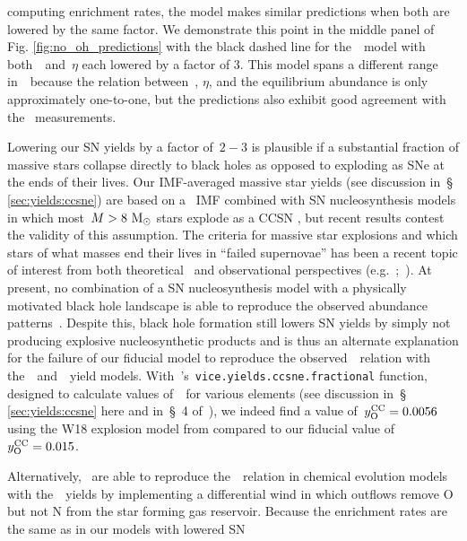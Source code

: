 \documentclass[ms.tex]{subfiles}
\begin{document}
computing enrichment rates, the model makes similar predictions when both are
lowered by the same factor.
We demonstrate this point in the middle panel of Fig.
\ref{fig:no_oh_predictions} with the black dashed line for the~\cristallo~model
with both~~and~$\eta$ each lowered by a factor of 3.
This model spans a different range in~\oh~because the relation between~,
$\eta$, and the equilibrium abundance is only approximately one-to-one, but the
predictions also exhibit good agreement with the~\citet{Dopita2016}
measurements.
\par
Lowering our SN yields by a factor of~$2 - 3$ is plausible if a substantial
fraction of massive stars collapse directly to black holes as opposed to
exploding as SNe at the ends of their lives.
Our IMF-averaged massive star yields (see discussion in~\S
\ref{sec:yields:ccsne}) are based on a~\citet{Kroupa2001} IMF combined with SN
nucleosynthesis models in which most~$M > 8~\text{M}_\odot$ stars explode as a CCSN
\cite[e.g.][]{Woosley1995, Chieffi2004, Chieffi2013, Limongi2018, Nomoto2013},
but recent results contest the validity of this assumption.
The criteria for massive star explosions and which stars of what masses end
their lives in ``failed supernovae'' has been a recent topic of interest from
both theoretical~\citep[e.g.][]{Pejcha2015, Sukhbold2016, Ertl2016} and
observational perspectives (e.g.~\citealp*{Gerke2015};~\citealp{Adams2017,
Basinger2021}).
At present, no combination of a SN nucleosynthesis model with a physically
motivated black hole landscape is able to reproduce the observed abundance
patterns~\citep{Griffith2021a}.
Despite this, black hole formation still lowers SN yields by simply not
producing explosive nucleosynthetic products and is thus an alternate
explanation for the failure of our fiducial model to reproduce the
observed~\ohno~relation with the~\cristallo~and~\ventura~yield models.
With~\vice's~\texttt{vice.yields.ccsne.fractional} function, designed to
calculate values of~~for various elements (see discussion in~\S
\ref{sec:yields:ccsne} here and in~\S~4 of~\citealp{Griffith2021a}), we indeed
find a value of~$y_\text{O}^\text{CC} = 0.0056$ using the W18 explosion model from
\citet{Sukhbold2016} compared to our fiducial value of~$y_\text{O}^\text{CC} = 0.015$.
\par
Alternatively,~\citet{Vincenzo2016a} are able to reproduce the~\ohno~relation
in chemical evolution models with the~\ventura~yields by implementing a
differential wind in which outflows remove O but not N from the star forming
gas reservoir.
Because the enrichment rates are the same as in our models with lowered SN
\end{document}
